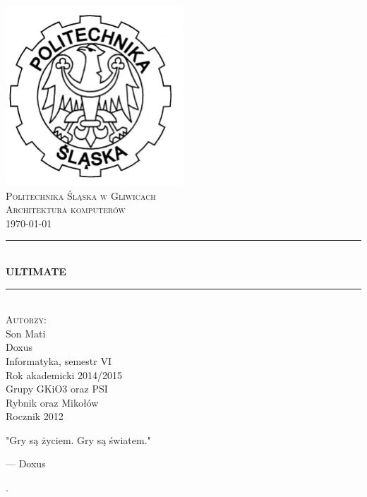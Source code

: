 \documentclass[a4paper,twoside]{article}
\newcommand{\HRule}{\rule{\linewidth}{0.5mm}}
\begin{document}





\begin{titlepage}
	\begin{center}
		
		\includegraphics[width=0.5\textwidth]{./images/logo.png}~\\[1cm]
		
		\textsc{\LARGE Politechnika Śląska w Gliwicach}\\[1.5cm]
		
		\textsc{\Large Architektura komputerów}\\
		\textsc{\today}\\[0.5cm]
		
		\HRule \\[0.4cm]
		{ \huge \bfseries ULTIMATE  \\[0.4cm] }
		
		\HRule \\[1.2cm]
		
		\textsc{\Large Autorzy:} \\
		{\large Son Mati} \\
		{\large Doxus}\\[0.8cm]
		
		Informatyka, semestr VI \\
		Rok akademicki 2014/2015 \\
		Grupy GKiO3 oraz PSI \\
		Rybnik oraz Mikołów \\
		Rocznik 2012\\[1.2cm]
		\epigraph{
			"Gry są życiem. Gry są światem."
		}{
		--- Doxus} .
		\vfill
		
	\end{center}
\end{titlepage}








	
\end{document}
